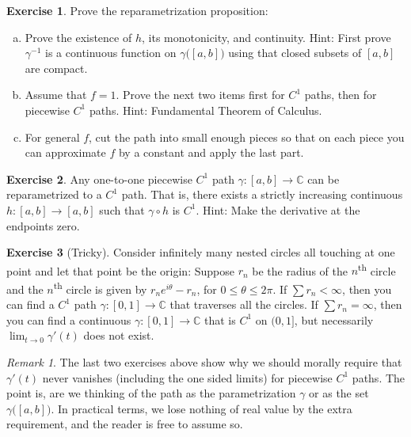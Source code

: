 \documentclass[12pt,openany]{book}
\newcommand{\C}{{\mathbb{C}}}
\theoremstyle{plain}
\theoremstyle{remark}
\newtheorem{remark}[thm]{Remark}
\theoremstyle{definition}
\newenvironment{exbox}{%
    \def\FrameCommand{\vrule width 1pt \relax\hspace {10pt}}%
    \MakeFramed {\advance \hsize -\width \FrameRestore }%
}{%
    \endMakeFramed
}
\newenvironment{exparts}{%
    \leavevmode\begin{enumerate}[a),noitemsep,topsep=0pt,parsep=0pt,partopsep=0pt]
}{%
    \end{enumerate}
}
\theoremstyle{exercise}
\newtheorem{exercise}{Exercise}[section]
\theoremstyle{example}
\begin{document}
\begin{exbox}
\begin{exercise}
\pagebreak[2]
Prove the reparametrization proposition:
\begin{exparts}
\item
Prove the existence of $h$, its monotonicity, and continuity.
Hint: First prove $\gamma^{-1}$ is a continuous function on
$\gamma\bigl([a,b]\bigr)$ using that closed subsets of $[a,b]$
are compact.
\item
Assume that $f=1$.  Prove the next two items first for $C^1$ paths,
then for piecewise $C^1$ paths.  Hint: Fundamental Theorem of Calculus.
\item
For general $f$, cut the path into small enough pieces so that
on each piece you can approximate $f$ by a constant and apply the
last part.
\end{exparts}
\end{exercise}

\begin{exercise}
Any one-to-one piecewise $C^1$ path $\gamma \colon [a,b] \to \C$
can be reparametrized
to a $C^1$ path.  That is, there exists a strictly increasing
continuous $h \colon [a,b] \to [a,b]$ such that
$\gamma \circ h$ is $C^1$.  Hint: Make the derivative at the endpoints
zero.
\end{exercise}

\begin{exercise}[Tricky]
Consider infinitely many nested circles all touching at one point
and let that point be the origin: Suppose $r_n$ be the radius of the
$n$\textsuperscript{th}
circle and the $n$\textsuperscript{th} circle is given by $r_n e^{i\theta} - r_n$, for $0 \leq
\theta \leq 2\pi$.  If $\sum r_n < \infty$, then you can find a $C^1$ path
$\gamma \colon
[0,1] \to \C$ that traverses all the circles.  If $\sum r_n = \infty$, then
you can find a continuous $\gamma \colon [0,1] \to \C$ that is $C^1$ on
$(0,1]$, but necessarily $\lim_{t \to 0} \gamma'(t)$ does not exist.
\end{exercise}
\end{exbox}

\begin{remark}
The last two exercises above show why we should morally
require that $\gamma'(t)$ never vanishes (including the one sided limits)
for piecewise $C^1$ paths.  The point is, are we thinking of the path
as the parametrization $\gamma$ or as the set $\gamma\bigl([a,b]\bigr)$.
In practical terms, we lose nothing of real value by the extra requirement,
and the reader is free to assume so.
\end{remark}
\end{document}
